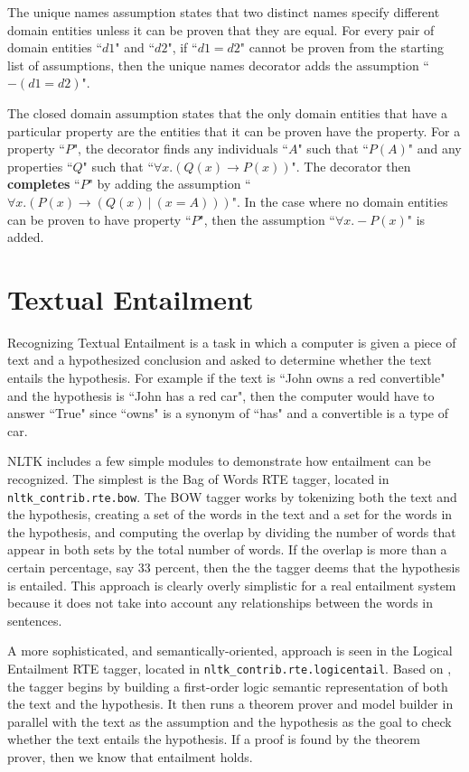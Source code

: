 \documentclass[11pt]{article}
\newcommand{\dhgcode}[1]{{\tt #1}}
\begin{document}
The unique names assumption states that two distinct names specify different domain entities unless it can be proven that they are equal.  For every pair of domain entities ``$d1$" and ``$d2$", if ``$d1 = d2$" cannot be proven from the starting list of assumptions, then the unique names decorator adds the assumption ``$-(d1 = d2)$".

The closed domain assumption states that the only domain entities that have a particular property are the entities that it can be proven have the property.  For a property ``$P$", the decorator finds any individuals ``$A$" such that ``$P(A)$" and any properties ``$Q$" such that ``$\forall x.(Q(x) \rightarrow P(x))$".  The decorator then \textbf{completes} ``$P$" by adding the assumption ``$\forall x.(P(x) \rightarrow (Q(x)~|~(x = A)))$".  In the case where no domain entities can be proven to have property ``$P$", then the assumption ``$\forall x.-P(x)$" is added.


\section{Textual Entailment}
Recognizing Textual Entailment is a task in which a computer is given a piece of text and a hypothesized conclusion and asked to determine whether the text entails the hypothesis.  For example if the text is ``John owns a red convertible" and the hypothesis is ``John has a red car", then the computer would have to answer ``True" since ``owns" is a synonym of ``has" and a convertible is a type of car.  

NLTK includes a few simple modules to demonstrate how entailment can be recognized.  The simplest is the Bag of Words RTE tagger, located in \dhgcode{nltk\_contrib.rte.bow}.  The BOW tagger works by tokenizing both the text and the hypothesis, creating a set of the words in the text and a set for the words in the hypothesis, and computing the overlap by dividing the number of words that appear in both sets by the total number of words.  If the overlap is more than a certain percentage, say 33 percent, then the the tagger deems that the hypothesis is entailed.  This approach is clearly overly simplistic for a real entailment system because it does not take into account any relationships between the words in sentences.

A more sophisticated, and semantically-oriented, approach is seen in the Logical Entailment RTE tagger, located in \dhgcode{nltk\_contrib.rte.logicentail}.  Based on \cite{BosRTE}, the tagger begins by building a first-order logic semantic representation of both the text and the hypothesis.  It then runs a theorem prover and model builder in parallel with the text as the assumption and the hypothesis as the goal to check whether the text entails the hypothesis.  If a proof is found by the theorem prover, then we know that entailment holds.
\end{document}
